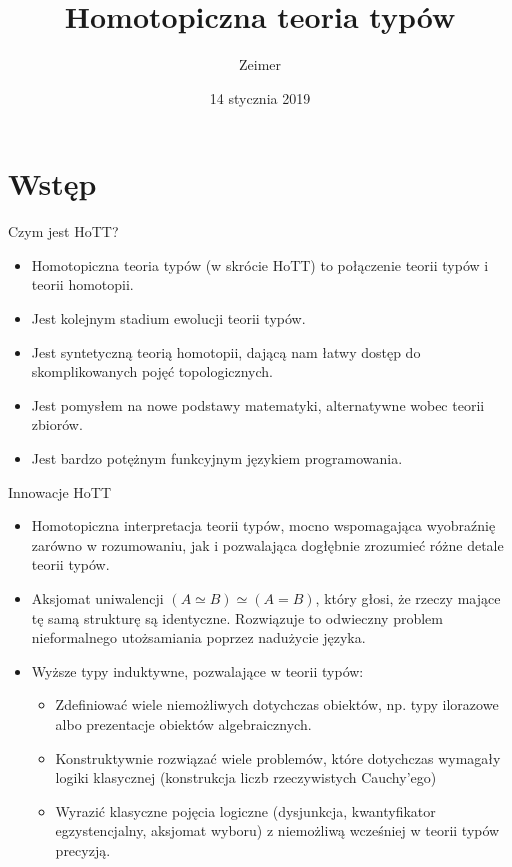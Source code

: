\documentclass{beamer}
\title{Homotopiczna teoria typów}
\author{Zeimer}
\date{14 stycznia 2019}
\begin{document}
\frame{\titlepage}

\frame{\tableofcontents}

\section{Wstęp}

\begin{frame}{Czym jest HoTT?}
\begin{itemize}
	\item Homotopiczna teoria typów (w skrócie HoTT) to połączenie teorii typów i teorii homotopii.
	\item Jest kolejnym stadium ewolucji teorii typów.
	\item Jest syntetyczną teorią homotopii, dającą nam łatwy dostęp do skomplikowanych pojęć topologicznych.
	\item Jest pomysłem na nowe podstawy matematyki, alternatywne wobec teorii zbiorów.
	\item Jest bardzo potężnym funkcyjnym językiem programowania.
\end{itemize}
\end{frame}

\begin{frame}{Innowacje HoTT}
\begin{itemize}
	\item Homotopiczna interpretacja teorii typów, mocno wspomagająca wyobraźnię zarówno w rozumowaniu, jak i pozwalająca dogłębnie zrozumieć różne detale teorii typów.
	\item Aksjomat uniwalencji $(A \simeq B) \simeq (A = B)$, który głosi, że rzeczy mające tę samą strukturę są identyczne. Rozwiązuje to odwieczny problem nieformalnego utożsamiania poprzez nadużycie języka.
	\item Wyższe typy induktywne, pozwalające w teorii typów:
	\begin{itemize}
		\item Zdefiniować wiele niemożliwych dotychczas obiektów, np. typy ilorazowe albo prezentacje obiektów algebraicznych.
		\item Konstruktywnie rozwiązać wiele problemów, które dotychczas wymagały logiki klasycznej (konstrukcja liczb rzeczywistych Cauchy'ego)
		\item Wyrazić klasyczne pojęcia logiczne (dysjunkcja, kwantyfikator egzystencjalny, aksjomat wyboru) z niemożliwą wcześniej w teorii typów precyzją.
	\end{itemize}
\end{itemize}
\end{frame}
\end{document}

